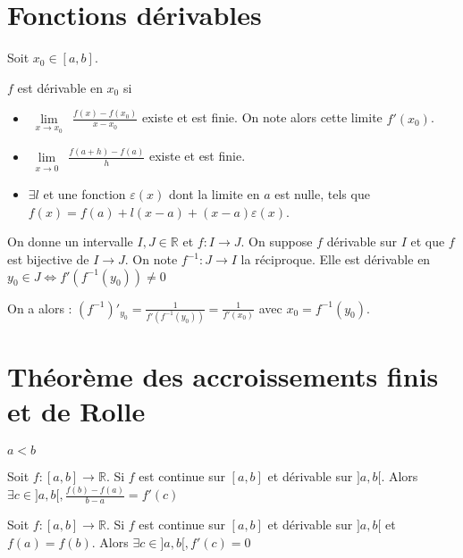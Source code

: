 \documentclass[french]{yLectureNote}
\newcommand{\Lim}[1]{\lim\limits_{\substack{#1}}\:}
\begin{document}
\section{Fonctions dérivables}
\begin{theorem}[Définitions]
Soit $x_0 \in[a,b]$.

$f$ est dérivable en $x_0$ si
\begin{itemize}
 \item $\Lim{x\to x_0} \frac{f(x)-f(x_0)}{x-x_0}$ existe et est finie. On note alors cette limite $f'(x_0)$.
 \item $\Lim{x\to 0} \frac{f(a+h)-f(a)}{h}$ existe et est finie.
 \item $\exists l$ et une fonction $\varepsilon(x)$ dont la limite en $a$ est nulle, tels que $f(x) = f(a)+l(x-a)+(x-a)\varepsilon(x)$.
\end{itemize}
\end{theorem}

\begin{theorem}
On donne un intervalle $I,J\in\mathbb{R}$ et $f:I\to J$. On suppose $f$ dérivable sur $I$ et que $f$ est bijective de $I\to J$. On note $f^{-1} :J\to I$ la réciproque. Elle est dérivable en $y_0\in J \iff f'(f^{-1}(y_0))\neq 0$

On a alors : $(f^{-1})'_{y_0} = \frac{1}{f'(f^{-1}(y_0))} = \frac{1}{f'(x_0)}$ avec $x_0 = f^{-1}(y_0)$.
\end{theorem}

\section{Théorème des accroissements finis et de Rolle}
$a<b$
\begin{theorem}
Soit $f:[a,b]\to \mathbb{R}$. Si $f$ est continue sur $[a,b]$ et dérivable sur $]a,b[$. Alors $\exists c\in]a,b[, \frac{f(b)-f(a)}{b-a} = f'(c)$
\end{theorem}
\begin{theorem}
Soit $f:[a,b]\to \mathbb{R}$. Si $f$ est continue sur $[a,b]$ et dérivable sur $]a,b[$ et $f(a) = f(b)$. Alors $\exists c\in]a,b[, f'(c) = 0$
\end{theorem}
\end{document}
